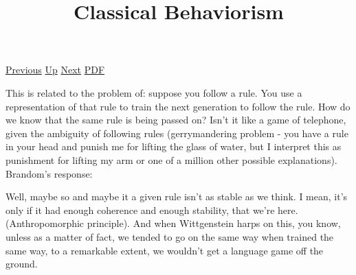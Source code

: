 \documentclass[12pt,a4paper]{report}
\begin{document}
 \href{doc/phil/PhilSituations/ChildrensGame.html}{Previous} 
 \href{doc/phil/PhilSituations.html}{Up} 
 \href{doc/phil/PhilSituations/MontaigneDog.html}{Next} 
 \href{doc/phil/PhilSituations/ClassicalBehaviorism.pdf}{PDF} 
\title{Classical Behaviorism}
This is related to the problem of: suppose you follow a rule. You use a
representation of that rule to train the next generation to follow the rule.
How do we know that the same rule is being passed on? Isn't it like a game of
telephone, given the ambiguity of following rules (gerrymandering problem - you
have a rule in your head and punish me for lifting the glass of water, but I
interpret this as punishment for lifting my arm or one of a million other
possible explanations). Brandom's response:

Well, maybe so and maybe it a given rule isn't as stable as we think. I mean,
it's only if it had enough coherence and enough stability, that we're here.
(Anthropomorphic principle). And when Wittgenstein harps on this, you know, unless
as a matter of fact, we tended to go on the same way when trained the same way,
to a remarkable extent, we wouldn't get a language game off the ground.
\end{document}
